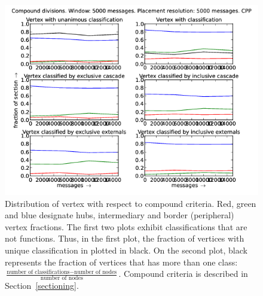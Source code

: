 \documentclass[%
 aip,
 jmp,%
 amsmath,amssymb,
 reprint,%
]{revtex4-1}
\begin{document}
\begin{figure}[hbtp] 
   \centering
        \includegraphics[width=\textwidth]{figs/CPP/5000_2}
    \caption{Distribution of vertex with respect to compound criteria. Red, green and blue designate hubs, intermediary and border (peripheral) vertex fractions. The first two plots exhibit classifications that are not functions. Thus, in the first plot, the fraction of vertices with unique classification in plotted in black. On the second plot, black represents the fraction of vertices that has more than one class: $\frac{\text{number of classifications} - \text{number of nodes}}{\text{number of nodes}}$. Compound criteria is described in Section~\ref{sectioning}.}
    \label{fig:cpp5000_}
\end{figure}
\end{document}
